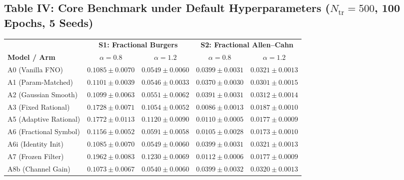 \documentclass[11pt,a4paper]{article}
\begin{document}
\subsection*{Table IV: Core Benchmark under Default Hyperparameters ($N_{\text{tr}}=500$, 100 Epochs, 5 Seeds)}
\begin{center}
\footnotesize
\setlength{\tabcolsep}{5pt}
\begin{tabular}{lcccc}
\toprule
 & \multicolumn{2}{c}{\textbf{S1: Fractional Burgers}} & \multicolumn{2}{c}{\textbf{S2: Fractional Allen--Cahn}} \\
\cmidrule(lr){2-3}\cmidrule(lr){4-5}
\textbf{Model / Arm} & $\alpha=0.8$ & $\alpha=1.2$ & $\alpha=0.8$ & $\alpha=1.2$ \\
\midrule
A0 (Vanilla FNO) & $0.1085 \pm 0.0070$ & $0.0549 \pm 0.0060$ & $0.0399 \pm 0.0031$ & $0.0321 \pm 0.0013$ \\
A1 (Param-Matched) & $0.1101 \pm 0.0039$ & $0.0546 \pm 0.0033$ & $0.0370 \pm 0.0030$ & $0.0301 \pm 0.0015$ \\
A2 (Gaussian Smooth) & $0.1099 \pm 0.0063$ & $0.0551 \pm 0.0062$ & $0.0391 \pm 0.0031$ & $0.0312 \pm 0.0014$ \\
A3 (Fixed Rational) & $0.1728 \pm 0.0071$ & $0.1054 \pm 0.0052$ & $\mathbf{0.0086 \pm 0.0013}$ & $0.0187 \pm 0.0010$ \\
A5 (Adaptive Rational) & $0.1772 \pm 0.0113$ & $0.1120 \pm 0.0090$ & $0.0110 \pm 0.0005$ & $0.0177 \pm 0.0009$ \\
A6 (Fractional Symbol) & $0.1156 \pm 0.0052$ & $0.0591 \pm 0.0058$ & $0.0105 \pm 0.0028$ & $\mathbf{0.0173 \pm 0.0010}$ \\
A6i (Identity Init) & $0.1085 \pm 0.0070$ & $0.0549 \pm 0.0060$ & $0.0399 \pm 0.0031$ & $0.0321 \pm 0.0013$ \\
A7 (Frozen Filter) & $0.1962 \pm 0.0083$ & $0.1230 \pm 0.0069$ & $0.0112 \pm 0.0006$ & $0.0177 \pm 0.0009$ \\
A8b (Channel Gain) & $\mathbf{0.1073 \pm 0.0067}$ & $\mathbf{0.0540 \pm 0.0060}$ & $0.0399 \pm 0.0032$ & $0.0320 \pm 0.0013$ \\
\bottomrule
\end{tabular}
\end{center}
\end{document}
